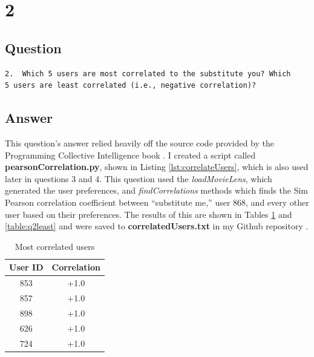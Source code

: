 \documentclass[letterpaper,11pt]{article}
\begin{document}
 


\clearpage


\section*{2}

\subsection*{Question}

\begin{verbatim}
2.  Which 5 users are most correlated to the substitute you? Which
5 users are least correlated (i.e., negative correlation)?
\end{verbatim}

\subsection*{Answer}

This question's answer relied heavily off the source code provided by the Programming Collective Intelligence book \cite{collectiveIntell}. I created a script called \textbf{pearsonCorrelation.py}, shown in Listing \ref{lst:correlateUsers}, which is also used later in questions 3 and 4. This question used the \textit{loadMovieLens}, which generated the user preferences, and \textit{findCorrelations} methods which finds the Sim Pearson correlation coefficient between ``substitute me,'' user 868, and every other user based on their preferences. The results of this are shown in Tables \ref{table:q2most} and \ref{table:q2least} and were saved to \textbf{correlatedUsers.txt} in my Github repository \cite{github}.

\begin{table}[htb]
\centering
\begin{tabular}{ | c | c |}
\hline
\textbf{User ID} & \textbf{Correlation} \\
\hline
853 & +1.0 \\
\hline
857 & +1.0 \\
\hline
898 & +1.0 \\ 
\hline
626 & +1.0 \\
\hline
724 & +1.0 \\
\hline
\end{tabular}
\caption{Most correlated users}
\label{table:q2most}
\end{table}
\end{document}
